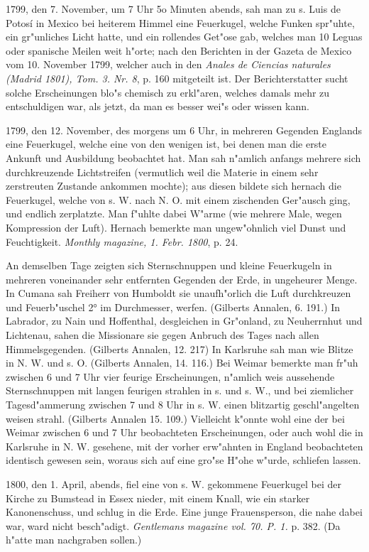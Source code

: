 \documentclass[a4paper, 11pt, oneside, polutonikogreek, german]{article}
\begin{document}
1799, den 7. November, um 7 Uhr 5o Minuten abends, sah man zu s. Luis de Potosí in Mexico bei heiterem Himmel eine Feuerkugel, welche Funken spr"uhte, ein gr"unliches Licht hatte, und ein rollendes Get"ose gab, welches man 10 Leguas oder spanische Meilen weit h"orte; nach den Berichten in der Gazeta de Mexico vom 10. November 1799, welcher auch in den \emph{Anales de Ciencias naturales (Madrid 1801), Tom. 3. Nr. 8}, p. 160 mitgeteilt ist. Der Berichterstatter sucht solche Erscheinungen blo"s chemisch zu erkl"aren, welches damals mehr zu entschuldigen war, als jetzt, da man es besser wei"s oder wissen kann.

1799, den 12. November, des morgens um 6 Uhr, in mehreren Gegenden Englands eine Feuerkugel, welche eine von den wenigen ist, bei denen man die erste Ankunft und Ausbildung beobachtet hat. Man sah n"amlich anfangs mehrere sich durchkreuzende Lichtstreifen (vermutlich weil die Materie in einem sehr zerstreuten Zustande ankommen mochte); aus diesen bildete sich hernach die Feuerkugel, welche von s. W. nach N. O. mit einem zischenden Ger"ausch ging, und endlich zerplatzte. Man f"uhlte dabei W"arme (wie mehrere Male, wegen Kompression der Luft). Hernach bemerkte man ungew"ohnlich viel Dunst und Feuchtigkeit. \emph{Monthly magazine, 1. Febr. 1800}, p. 24.

An demselben Tage zeigten sich Sternschnuppen und kleine Feuerkugeln in mehreren voneinander sehr entfernten Gegenden der Erde, in ungeheurer Menge. In Cumana sah Freiherr von Humboldt sie unaufh"orlich die Luft durchkreuzen und Feuerb"uschel 2° im Durchmesser, werfen. (Gilberts Annalen, 6. 191.) In Labrador, zu Nain und Hoffenthal, desgleichen in Gr"onland, zu Neuherrnhut und Lichtenau, sahen die Missionare sie gegen Anbruch des Tages nach allen Himmelsgegenden. (Gilberts Annalen, 12. 217) In Karlsruhe sah man wie Blitze in N. W. und s. O. (Gilberts Annalen, 14. 116.) Bei Weimar bemerkte man fr"uh zwischen 6 und 7 Uhr vier feurige Erscheinungen, n"amlich weis aussehende Sternschnuppen mit langen feurigen strahlen in s. und s. W., und bei ziemlicher Tagesd"ammerung zwischen 7 und 8 Uhr in s. W. einen blitzartig geschl"angelten weisen strahl. (Gilberts Annalen 15. 109.) Vielleicht k"onnte wohl eine der bei Weimar zwischen 6 und 7 Uhr beobachteten Erscheinungen, oder auch wohl die in Karlsruhe in N. W. gesehene, mit der vorher erw"ahnten in England beobachteten identisch gewesen sein, woraus sich auf eine gro"se H"ohe w"urde, schliefen lassen.

1800, den 1. April, abends, fiel eine von s. W. gekommene Feuerkugel bei der Kirche zu Bumstead in Essex nieder, mit einem Knall, wie ein starker Kanonenschuss, und schlug in die Erde. Eine junge Frauensperson, die nahe dabei war, ward nicht besch"adigt. \emph{Gentlemans magazine vol. 70. P. 1.} p. 382. (Da h"atte man nachgraben sollen.)
\end{document}
